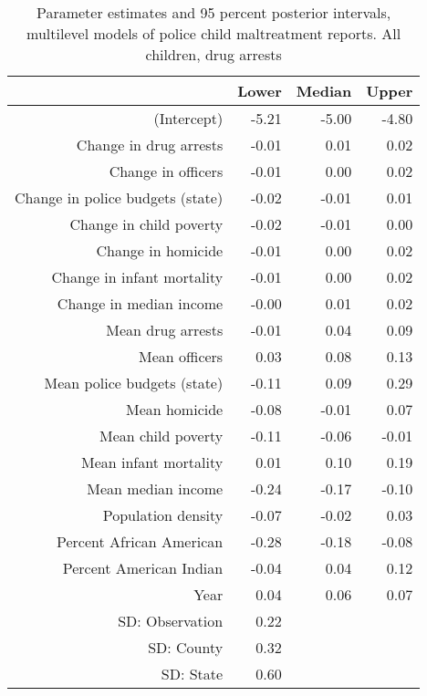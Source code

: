 \begin{table}[ht]
\centering
\begin{tabular}{rrrr}
  \hline
 & Lower & Median & Upper \\ 
  \hline
(Intercept) & -5.21 & -5.00 & -4.80 \\ 
  Change in drug arrests & -0.01 & 0.01 & 0.02 \\ 
  Change in officers & -0.01 & 0.00 & 0.02 \\ 
  Change in police budgets (state) & -0.02 & -0.01 & 0.01 \\ 
  Change in child poverty & -0.02 & -0.01 & 0.00 \\ 
  Change in homicide & -0.01 & 0.00 & 0.02 \\ 
  Change in infant mortality & -0.01 & 0.00 & 0.02 \\ 
  Change in median income & -0.00 & 0.01 & 0.02 \\ 
  Mean drug arrests & -0.01 & 0.04 & 0.09 \\ 
  Mean officers & 0.03 & 0.08 & 0.13 \\ 
  Mean police budgets (state) & -0.11 & 0.09 & 0.29 \\ 
  Mean homicide & -0.08 & -0.01 & 0.07 \\ 
  Mean child poverty & -0.11 & -0.06 & -0.01 \\ 
  Mean infant mortality & 0.01 & 0.10 & 0.19 \\ 
  Mean median income & -0.24 & -0.17 & -0.10 \\ 
  Population density & -0.07 & -0.02 & 0.03 \\ 
  Percent African American & -0.28 & -0.18 & -0.08 \\ 
  Percent American Indian & -0.04 & 0.04 & 0.12 \\ 
  Year & 0.04 & 0.06 & 0.07 \\ 
  SD: Observation & 0.22 &  &  \\ 
  SD: County & 0.32 &  &  \\ 
  SD: State & 0.60 &  &  \\ 
   \hline
\end{tabular}
\caption{Parameter estimates and 95 percent posterior intervals, multilevel models of 
             police child maltreatment reports. All children, drug arrests} 
\end{table}
